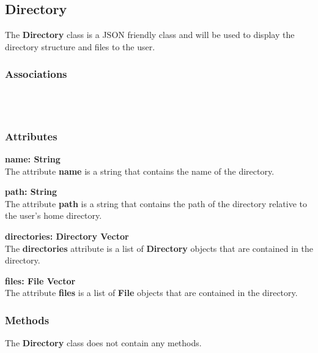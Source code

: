\subsection{Directory}
The \textbf{Directory} class is a JSON friendly class and will be used to display the directory
structure and files to the user.

\subsubsection{Associations}
\textbf{} \\

\textbf{} \\

\subsubsection{Attributes}
\textbf{name: String} \\
The attribute \textbf{name} is a string that contains the name of the directory.

\textbf{path: String} \\
The attribute \textbf{path} is a string that contains the path of the directory
relative to the user's home directory.

\textbf{directories: Directory Vector} \\
The \textbf{directories} attribute is a list of \textbf{Directory} objects that
are contained in the directory.

\textbf{files: File Vector} \\
The attribute \textbf{files} is a list of \textbf{File} objects that are contained
in the directory.

\subsubsection{Methods}
The \textbf{Directory} class does not contain any methods.


